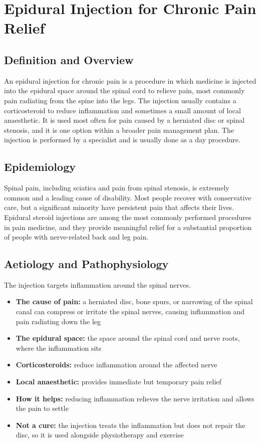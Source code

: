 \chapter{Epidural Injection for Chronic Pain Relief}

\section*{Definition and Overview}
An epidural injection for chronic pain is a procedure in which medicine is injected into the epidural space around the spinal cord to relieve pain, most commonly pain radiating from the spine into the legs. The injection usually contains a corticosteroid to reduce inflammation and sometimes a small amount of local anaesthetic. It is used most often for pain caused by a herniated disc or spinal stenosis, and it is one option within a broader pain management plan. The injection is performed by a specialist and is usually done as a day procedure.

\section*{Epidemiology}
Spinal pain, including sciatica and pain from spinal stenosis, is extremely common and a leading cause of disability. Most people recover with conservative care, but a significant minority have persistent pain that affects their lives. Epidural steroid injections are among the most commonly performed procedures in pain medicine, and they provide meaningful relief for a substantial proportion of people with nerve-related back and leg pain.

\section*{Aetiology and Pathophysiology}
The injection targets inflammation around the spinal nerves.
\begin{itemize}
    \item \textbf{The cause of pain:} a herniated disc, bone spurs, or narrowing of the spinal canal can compress or irritate the spinal nerves, causing inflammation and pain radiating down the leg
    \item \textbf{The epidural space:} the space around the spinal cord and nerve roots, where the inflammation sits
    \item \textbf{Corticosteroids:} reduce inflammation around the affected nerve
    \item \textbf{Local anaesthetic:} provides immediate but temporary pain relief
    \item \textbf{How it helps:} reducing inflammation relieves the nerve irritation and allows the pain to settle
    \item \textbf{Not a cure:} the injection treats the inflammation but does not repair the disc, so it is used alongside physiotherapy and exercise
\end{itemize}

